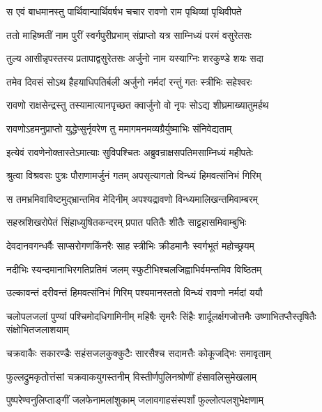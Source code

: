 \twolineshloka
{स एवं बाधमानस्तु पार्थिवान्पार्थिवर्षभ}
{चचार रावणो राम पृथिव्यां पृथिवीपते} %

\twolineshloka
{ततो माहिष्मतीं नाम पुरीं स्वर्गपुरीप्रभाम्}
{संप्राप्तो यत्र साम्निध्यं परमं वसुरेतसः} %

\twolineshloka
{तुल्य आसीन्नृपस्तस्य प्रतापाद्वसुरेतसः}
{अर्जुनो नाम यस्याग्निः शरकुण्डे शयः सदा} %

\twolineshloka
{तमेव दिवसं सोऽथ हैहयाधिपतिर्बली}
{अर्जुनो नर्मदां रन्तुं गतः स्त्रीभिः सहेश्वरः} %

\twolineshloka
{रावणो राक्षसेन्द्रस्तु तस्यामात्यानपृच्छत}
{क्वार्जुनो वो नृपः सोऽद्य शीघ्रमाख्यातुमर्हथ} %

\twolineshloka
{रावणोऽहमनुप्राप्तो युद्धेप्सुर्नृवरेण तु}
{ममागमनमव्यग्रैर्युष्माभिः संनिवेद्यताम्} %

\twolineshloka
{इत्येवं रावणेनोक्तास्तेऽमात्याः सुविपश्चितः}
{अब्रुवन्राक्षसपतिमसाम्निध्यं महीपतेः} %

\twolineshloka
{श्रुत्वा विश्रवसः पुत्रः पौराणामर्जुनं गतम्}
{अपसृत्यागतो विन्ध्यं हिमवत्संनिभं गिरिम्} %

\twolineshloka
{स तमभ्रमिवाविष्टमुद्भ्रान्तमिव मेदिनीम्}
{अपश्यद्रावणो विन्ध्यमालिखन्तमिवाम्बरम्} %

\twolineshloka
{सहस्रशिखरोपेतं सिंहाध्युषितकन्दरम्}
{प्रपात पतितैः शीतैः साट्टहासमिवाम्बुभिः} %

\twolineshloka
{देवदानवगन्धर्वैः साप्सरोगणकिंनरैः}
{साह स्त्रीभिः क्रीडमानैः स्वर्गभूतं महोच्छ्रयम्} %

\twolineshloka
{नदीभिः स्यन्दमानाभिरगतिप्रतिमं जलम्}
{स्फुटीभिश्चलजिह्वाभिर्वमन्तमिव विष्ठितम्} %

\twolineshloka
{उल्कावन्तं दरीवन्तं हिमवत्संनिभं गिरिम्}
{पश्यमानस्ततो विन्ध्यं रावणो नर्मदां ययौ} %

\threelineshloka
{चलोपलजलां पुण्यां पश्चिमोदधिगामिनीम्}
{महिषैः सृमरैः सिंहैः शार्दूलर्क्षगजोत्तमैः}
{उष्णाभितप्तैस्तृषितैः संक्षोभितजलाशयाम्} %

\twolineshloka
{चक्रवाकैः सकारण्डैः सहंसजलकुक्कुटैः}
{सारसैश्च सदामत्तैः कोकूजद्भिः समावृताम्} %

\twolineshloka
{फुल्लद्रुमकृतोत्तंसां चक्रवाकयुगस्तनीम्}
{विस्तीर्णपुलिनश्रोणीं हंसावलिसुमेखलाम्} %

\twolineshloka
{पुष्परेण्वनुलिप्ताङ्गीं जलफेनामलांशुकाम्}
{जलावगाहसंस्पर्शां फुल्लोत्पलशुभेक्षणाम्} %

